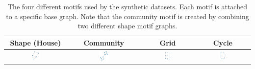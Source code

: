 \begin{table}[h]
    \centering
    \captionsetup{width=.9\textwidth}
    \begin{tabular}{cccc}
        \textbf{Shape (House)} &
        \textbf{Community} &
        \textbf{Grid} &
        \textbf{Cycle}\\
        \midrule
        \includegraphics[width=0.15\textwidth]{figures/house.png} &
        \includegraphics[width=0.15\textwidth]{figures/community.png} &
        \includegraphics[width=0.15\textwidth]{figures/grid.png} &
        \includegraphics[width=0.15\textwidth]{figures/cycle.png} \\
    \end{tabular}
    \caption{The four different motifs used by the synthetic datasets. Each motif is attached to a specific base graph. Note that the community motif is created by combining two different shape motif graphs.}
    \label{tab:motifs}
\end{table}

